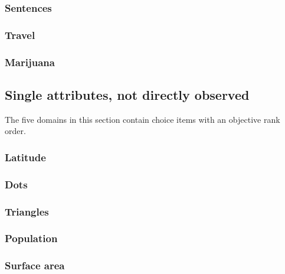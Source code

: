 \documentclass[11pt,letter]{article}
\begin{document}


\subsubsection{Sentences}



\subsubsection{Travel}



\subsubsection{Marijuana}



\subsection{Single attributes, not directly observed}

The five domains in this section contain choice items with an objective rank order.

\subsubsection{Latitude}



\subsubsection{Dots}



\subsubsection{Triangles}



\subsubsection{Population}



\subsubsection{Surface area}
\end{document}
